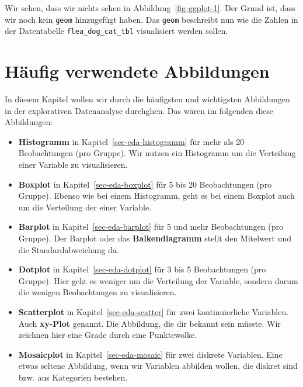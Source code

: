 \documentclass[
  letterpaper,
]{scrbook}
\providecommand{\tightlist}{%
  \setlength{\itemsep}{0pt}\setlength{\parskip}{0pt}}\usepackage{longtable,booktabs,array}
\begin{document}
Wir sehen, dass wir nichts sehen in Abbildung~\ref{fig-ggplot-1}. Der
Grund ist, dass wir noch kein \texttt{geom} hinzugefügt haben. Das
\texttt{geom} beschreibt nun wie die Zahlen in der Datentabelle
\texttt{flea\_dog\_cat\_tbl} visualisiert werden sollen.

\hypertarget{huxe4ufig-verwendete-abbildungen}{%
\section{Häufig verwendete
Abbildungen}\label{huxe4ufig-verwendete-abbildungen}}

In diesem Kapitel wollen wir durch die häufigsten und wichtigsten
Abbildungen in der explorativen Datenanalyse durchghen. Das wären im
folgenden diese Abbildungen:

\begin{itemize}
\tightlist
\item
  \textbf{Histogramm} in Kapitel~\ref{sec-eda-histogramm} für mehr als
  20 Beobachtungen (pro Gruppe). Wir nutzen ein Histogramm um die
  Verteilung einer Variable zu visualisieren.
\item
  \textbf{Boxplot} in Kapitel~\ref{sec-eda-boxplot} für 5 bis 20
  Beobachtungen (pro Gruppe). Ebenso wie bei einem Histogramm, geht es
  bei einem Boxplot auch um die Verteilung der einer Variable.
\item
  \textbf{Barplot} in Kapitel~\ref{sec-eda-barplot} für 5 und mehr
  Beobachtungen (pro Gruppe). Der Barplot oder das
  \textbf{Balkendiagramm} stellt den Mitelwert und die
  Standardabweichung da.
\item
  \textbf{Dotplot} in Kapitel~\ref{sec-eda-dotplot} für 3 bis 5
  Beobachtungen (pro Gruppe). Hier geht es weniger um die Verteilung der
  Variable, sondern darum die wenigen Beobachtungen zu visualisieren.
\item
  \textbf{Scatterplot} in Kapitel~\ref{sec-eda-scatter} für zwei
  kontinuierliche Variablen. Auch \textbf{xy-Plot} genannt. Die
  Abbildung, die dir bekannt sein müsste. Wir zeichnen hier eine Grade
  durch eine Punktewolke.
\item
  \textbf{Mosaicplot} in Kapitel~\ref{sec-eda-mosaic} für zwei diskrete
  Variablen. Eine etwas seltene Abbildung, wenn wir Variablen abbilden
  wollen, die diskret sind bzw. aus Kategorien bestehen.
\end{itemize}

{}
\end{document}

